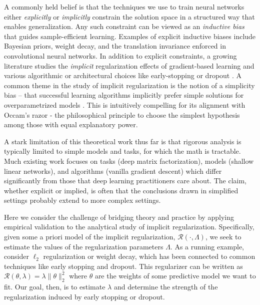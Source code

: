\documentclass[10pt]{article}
\begin{document}
A commonly held belief is that the techniques we use to train neural networks either \emph{explicitly} or \emph{implicitly} constrain the solution space in a structured way that enables generalization. Any such constraint can be viewed as an \emph{inductive bias} that guides sample-efficient learning. Examples of explicit inductive biases include Bayesian priors, weight decay, and the translation invariance enforced in convolutional neural networks. In addition to explicit constraints, a growing literature studies the \emph{implicit} regularization effects of gradient-based learning and various algorithmic or architectural choices like early-stopping or dropout \citep{santos_equivalence_1996, neyshabur_search_2015, soudry_implicit_2018, arora_implicit_2019, chizat_implicit_2020, nacson_implicit_2022, woodworth_kernel_2020, razin_implicit_2020}. A common theme in the study of implicit regularization is the notion of a simplicity bias -- that successful learning algorithms implicitly prefer simple solutions for overparametrized models \citep{wilson_deep_2025, rahaman_spectral_2019, nakkiran_sgd_2019}. This is intuitively compelling for its alignment with Occam's razor - the philosophical principle to choose the simplest hypothesis among those with equal explanatory power. 

A stark limitation of this theoretical work thus far is that rigorous analysis is typically limited to simple models and tasks, for which the math is tractable. Much existing work focuses on tasks (deep matrix factorization), models (shallow linear networks), and algorithms (vanilla gradient descent) which differ significantly from those that deep learning practitioners care about. The claim, whether explicit or implied, is often that the conclusions drawn in simplified settings probably extend to more complex settings. 

Here we consider the challenge of bridging theory and practice by applying empirical validation to the analytical study of implicit regularization. Specifically, given some a priori model of the implicit regularization, $\mathcal{R}(\cdot, \Lambda)$, we seek to estimate the values of the regularization parameters $\Lambda$. As a running example, consider $\ell_2$ regularization or weight decay, which has been connected to common techniques like early stopping and dropout. This regularizer can be written as $\mathcal{R}(\theta, \lambda) = \lambda \| \theta \|_2^2$ where $\theta$ are the weights of some predictive model we want to fit. Our goal, then, is to estimate $\lambda$ and determine the strength of the regularization induced by early stopping or dropout. 
\end{document}
